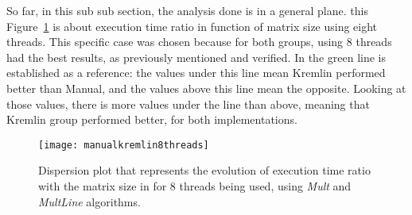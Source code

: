 So far, in this sub sub section, the analysis done is in a general plane. this Figure~\ref{fig:manualkremlin8threads} is about execution time ratio in function of matrix size using eight threads. This specific case was chosen because for both groups, using 8 threads had the best results, as previously mentioned and verified. In the green line is established as a reference: the values under this line mean Kremlin performed better than Manual, and the values above this line mean the opposite. Looking at those values, there is more values under the line than above, meaning that Kremlin group performed better, for both implementations. 
\begin{figure}[htb]
	\begin{center}
		\leavevmode
		\texttt{[image: manualkremlin8threads]}
		\caption{Dispersion plot that represents the evolution of execution time ratio with the matrix size in for 8 threads being used, using \textit{Mult} and \textit{MultLine} algorithms.}
		\label{fig:manualkremlin8threads}
	\end{center}
\end{figure}

